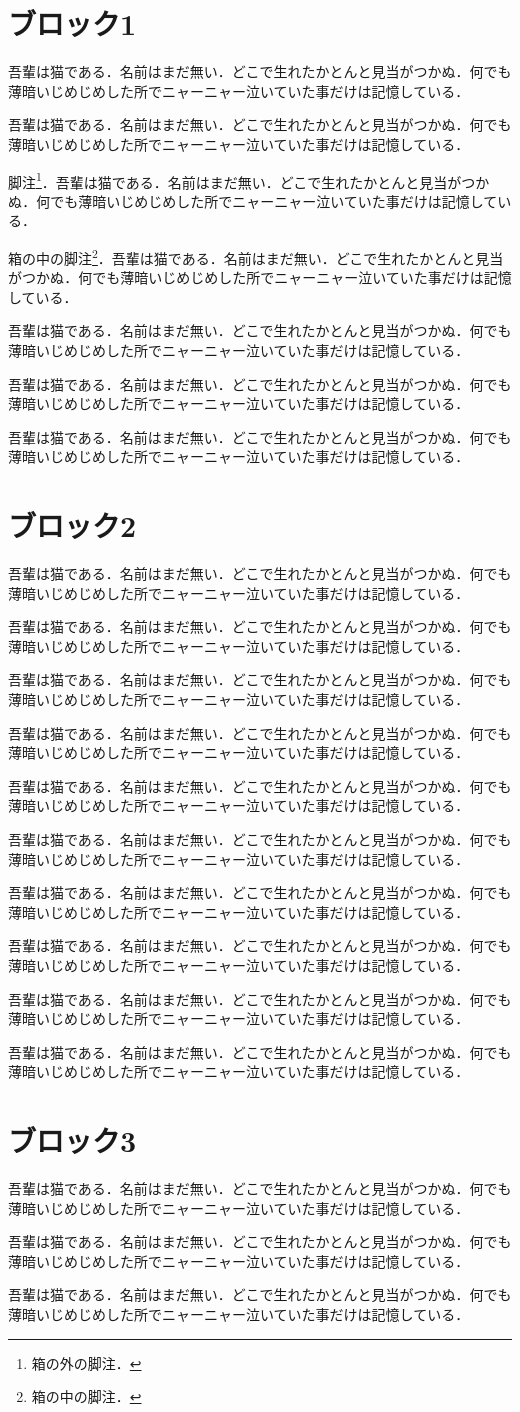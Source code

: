 \documentclass[twocolumn,fontsize=10pt]{jlreq}
\newcommand\para{吾輩は猫である．名前はまだ無い．どこで生れたかとんと見当がつかぬ．何でも薄暗いじめじめした所でニャーニャー泣いていた事だけは記憶している．\par}
\begin{document}
\section{ブロック1}
\para\para
脚注\footnote{箱の外の脚注．}．\para
\begin{tcolorbox}[title=箱と脚注]箱の中の脚注\footnote{箱の中の脚注．}．\para\end{tcolorbox}
\begin{tcolorbox}[float=t,title=フロートの箱]\para\end{tcolorbox}
\para\para
{}
\section{ブロック2}
\para
\begin{tcolorbox}[breakable,title=分割できる箱]\para\para\para\para\para\para\end{tcolorbox}
\begin{tcolorbox}[float*=t,width=\textwidth,title=段抜きの箱]\para\end{tcolorbox}
\para\para
{}
\section{ブロック3}
\para
\begin{tcolorbox}\para\end{tcolorbox}
\para
\end{document}
